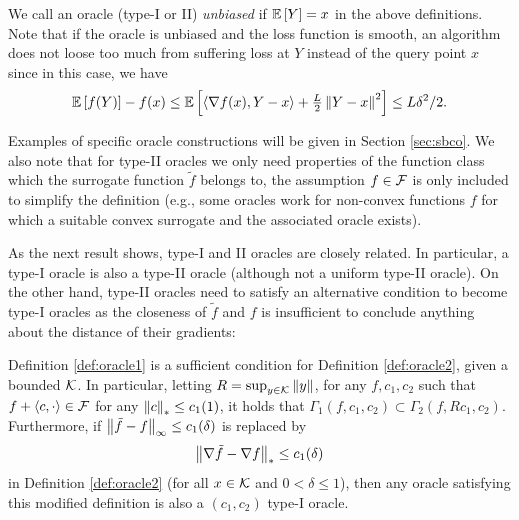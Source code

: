 We call an oracle (type-I or II)  \emph{unbiased} if $\mathbb{E}\left[Y\right]=x$ in the above definitions. Note that if the oracle is unbiased and the loss function is smooth,
 an algorithm does not loose too much from suffering loss at $Y$ instead of the query point $x$
 since in this case, we have 
$$\mathbb{E}\left[f(Y)\right]-f(x) \le \mathbb{E}\left[\langle \nabla f(x), Y-x \rangle+\tfrac{L}{2}\left\|Y-x\right\|^2\right] \le L\delta^2/2.$$

Examples of specific oracle constructions will be given in  Section \ref{sec:sbco}. We also note that for type-II oracles we only need properties of the function class which the surrogate function $\tilde{f}$ belongs to, the assumption $f \in \mathcal{F}$ is only included to simplify the definition (e.g., some oracles work for non-convex functions $f$ for which a suitable convex surrogate and the associated oracle exists).

As the next result shows, type-I and II oracles are closely related.
In particular, a type-I oracle is also a type-II oracle (although not a uniform type-II oracle). On the other hand, type-II oracles need to satisfy an alternative condition to become type-I oracles as the closeness of $\tilde{f}$ and $f$ is insufficient to conclude anything about the distance of their gradients:
\begin{proposition}\label{thm:typered}
Definition \ref{def:oracle1} is a sufficient condition for Definition \ref{def:oracle2}, given a bounded $\mathcal{K}$. 
In particular, letting $R = \sup_{y \in \mathcal{K}}\left\|y\right\|$, 
for any $f,c_1,c_2$ such that $f+\langle c,\cdot \rangle \in \mathcal{F}$ for any $\left\|c\right\|_* \le c_1(1)$, it holds that $\Gamma_1(f,c_1,c_2) \subset \Gamma_2(f,Rc_1,c_2)$. 
Furthermore, if $\big\|\tilde{f}-f\big\|_\infty \le c_1(\delta)$ is replaced by 
\begin{align}
\label{eq:oracle2alt}
\big\|\nabla \tilde{f}- \nabla f\big\|_* \le c_1(\delta)
\end{align}
in Definition \ref{def:oracle2} (for all $x\in\mathcal{K}$ and $0<\delta \le 1$), then any oracle satisfying this modified definition  is also a $(c_1,c_2)$ type-I oracle.
\end{proposition}


